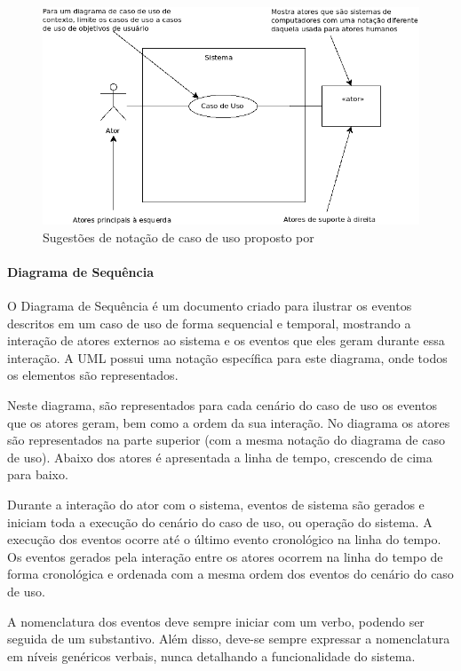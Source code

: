 \begin{figure}
	\centering
	\includegraphics[scale=0.75]{images/exemplo-uml.png}
	\caption{Sugestões de notação de caso de uso proposto por~\cite{larman08}}
	\label{fig:diagrama-uml}
\end{figure}

\paragraph{Diagrama de Sequência}

O Diagrama de Sequência é um documento criado para ilustrar os eventos descritos em um caso de uso de forma sequencial e temporal, mostrando a interação de atores externos ao sistema e os eventos que eles geram durante essa interação. A UML possui uma notação específica para este diagrama, onde todos os elementos são representados.

Neste diagrama, são representados para cada cenário do caso de uso os eventos que os atores geram, bem como a ordem da sua interação. No diagrama os atores são representados na parte superior (com a mesma notação do diagrama de caso de uso). Abaixo dos atores é apresentada a linha de tempo, crescendo de cima para baixo. 

Durante a interação do ator com o sistema, eventos de sistema são gerados e iniciam toda a execução do cenário do caso de uso, ou operação do sistema. A execução dos eventos ocorre até o último evento cronológico na linha do tempo. Os eventos gerados pela interação entre os atores ocorrem na linha do tempo de forma cronológica e ordenada com a mesma ordem dos eventos do cenário do caso de uso.

A nomenclatura dos eventos deve sempre iniciar com um verbo, podendo ser seguida de um substantivo. Além disso, deve-se sempre expressar a nomenclatura em níveis genéricos verbais, nunca detalhando a funcionalidade do sistema.

